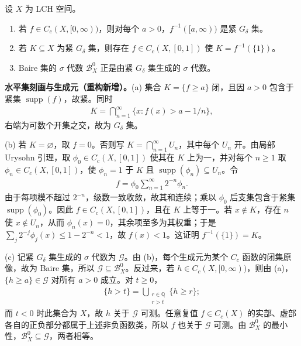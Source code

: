 \documentclass[../../main.tex]{subfiles}
\begin{document}
\begin{exercise}\label{exercise:ch07-compact-gdelta}
设 $X$ 为 LCH 空间。
\begin{enumerate}[label=\alph*.,ref=(\alph*)]
\item\label{item:ch07-level-compact-gdelta} 若 $f\in C_c(X,[0,\infty))$，则对每个 $a>0$，$f^{-1}([a,\infty))$ 是紧 $G_\delta$ 集。
\item\label{item:ch07-compact-gdelta-level-one} 若 $K\subseteq X$ 为紧 $G_\delta$ 集，则存在 $f\in C_c(X,[0,1])$ 使 $K=f^{-1}(\{1\})$。
\item\label{item:ch07-baire-generated-compact-gdelta} Baire 集的 $\sigma$ 代数 $\mathscr B_X^0$ 正是由紧 $G_\delta$ 集生成的 $\sigma$ 代数。
\end{enumerate}
\end{exercise}
\begin{solution}
\textbf{水平集刻画与生成元（重构新增）。}(a) 集合 $K=\{f\geqslant a\}$ 闭，且因 $a>0$ 包含于紧集 $\operatorname{supp}(f)$，故紧。同时
\begin{align*}
K=\bigcap_{n=1}^\infty\{x:f(x)>a-1/n\},
\end{align*}
右端为可数个开集之交，故为 $G_\delta$ 集。

(b) 若 $K=\varnothing$，取 $f=0$。否则写 $K=\bigcap_{n=1}^\infty U_n$，其中每个 $U_n$ 开。由局部 Urysohn 引理，取 $\phi_0\in C_c(X,[0,1])$ 使其在 $K$ 上为一，并对每个 $n\geqslant1$ 取 $\phi_n\in C_c(X,[0,1])$，使 $\phi_n=1$ 于 $K$ 且 $\operatorname{supp}(\phi_n)\subseteq U_n$。令
\begin{align*}
f=\phi_0\sum_{n=1}^\infty2^{-n}\phi_n.
\end{align*}
由于每项模不超过 $2^{-n}$，级数一致收敛，故其和连续；乘以 $\phi_0$ 后支集包含于紧集 $\operatorname{supp}(\phi_0)$。因此 $f\in C_c(X,[0,1])$，且在 $K$ 上等于一。若 $x\notin K$，存在 $n$ 使 $x\notin U_n$，从而 $\phi_n(x)=0$，其余项至多为其权重；于是 $\sum_j2^{-j}\phi_j(x)\leqslant1-2^{-n}<1$，故 $f(x)<1$。这证明 $f^{-1}(\{1\})=K$。

(c) 记紧 $G_\delta$ 集生成的 $\sigma$ 代数为 $\mathscr G$。由 (b)，每个生成元为某个 $C_c$ 函数的闭集原像，故为 Baire 集，所以 $\mathscr G\subseteq\mathscr B_X^0$。反过来，若 $h\in C_c(X,[0,\infty))$，则由 (a)，$\{h\geqslant a\}\in\mathscr G$ 对所有 $a>0$ 成立。对 $t\geqslant0$，
\begin{align*}
\{h>t\}=\bigcup_{\substack{r\in\mathbb Q\\r>t}}\{h\geqslant r\};
\end{align*}
而 $t<0$ 时此集合为 $X$，故 $h$ 关于 $\mathscr G$ 可测。任意复值 $f\in C_c(X)$ 的实部、虚部各自的正负部分都属于上述非负函数类，所以 $f$ 也关于 $\mathscr G$ 可测。由 $\mathscr B_X^0$ 的最小性，$\mathscr B_X^0\subseteq\mathscr G$，两者相等。
\end{solution}
\end{document}
